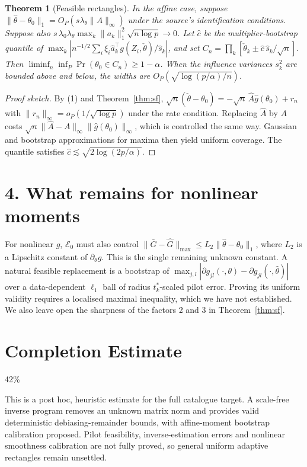 \documentclass[11pt]{article}
\newtheorem{theorem}{Theorem}
\theoremstyle{definition}
\begin{document}
\begin{theorem}[Feasible rectangles]\label{thm:rect}
In the affine case, suppose $\|\widehat\theta-\theta_0\|_1=O_P(s\lambda_\theta\|A\|_\infty)$ under the source's
identification conditions. Suppose also $s\,\lambda_0\lambda_\theta\max_k\|a_k\|_1^2\sqrt{n\log p}\to0$. Let
$\widehat c$ be the multiplier-bootstrap quantile of $\max_k|n^{-1/2}\sum_i\xi_i\widehat a_k^\top g(Z_i,\check\theta)/\widehat s_k|$,
and set $C_n=\prod_k[\check\theta_k\pm\widehat c\,\widehat s_k/\sqrt n]$. Then
$\liminf_n\inf_P\Pr(\theta_0\in C_n)\ge1-\alpha$. When the influence variances $s_k^2$ are bounded above and below,
the widths are $O_P(\sqrt{\log(p/\alpha)/n})$.
\end{theorem}
\begin{proof}[Proof sketch]
By (1) and Theorem~\ref{thm:sf}, $\sqrt n(\check\theta-\theta_0)=-\sqrt n\,\widehat A\widehat g(\theta_0)+r_n$ with
$\|r_n\|_\infty=o_P(1/\sqrt{\log p})$ under the rate condition. Replacing $\widehat A$ by $A$ costs
$\sqrt n\|\widehat A-A\|_{\infty}\|\widehat g(\theta_0)\|_\infty$, which is controlled the same way. Gaussian and bootstrap
approximations for maxima \cite{cck} then yield uniform coverage. The quantile satisfies $\widehat c\lesssim\sqrt{2\log(2p/\alpha)}$.
\end{proof}

\section*{4. What remains for nonlinear moments}
For nonlinear $g$, $\mathcal E_0$ must also control $\|\bar G-\widehat G\|_{\max}\le L_2\|\widehat\theta-\theta_0\|_1$, where
$L_2$ is a Lipschitz constant of $\partial_\theta g$. This is the single remaining unknown constant. A natural feasible
replacement is a bootstrap of $\max_{j,l}|\partial g_{jl}(\cdot,\theta)-\partial g_{jl}(\cdot,\widehat\theta)|$ over a data-dependent
$\ell_1$ ball of radius $t_k^*$-scaled pilot error. Proving its uniform validity requires a localised maximal inequality,
which we have not established. We also leave open the sharpness of the factors 2 and 3 in Theorem~\ref{thm:sf}.

\section{Completion Estimate}
42\%

This is a post hoc, heuristic estimate for the full catalogue target.
A scale-free inverse program removes an unknown matrix norm and provides valid deterministic debiasing-remainder bounds, with affine-moment bootstrap calibration proposed. Pilot feasibility, inverse-estimation errors and nonlinear smoothness calibration are not fully proved, so general uniform adaptive rectangles remain unsettled.
\end{document}
